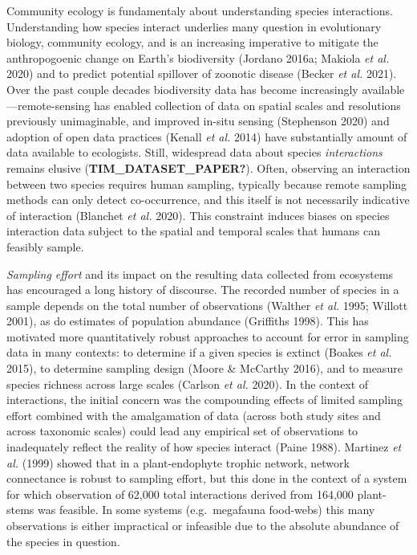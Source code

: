 \documentclass[10pt,oneside]{article}
\begin{document}
Community ecology is fundamentaly about understanding species
interactions. Understanding how species interact underlies many question
in evolutionary biology, community ecology, and is an increasing
imperative to mitigate the anthropogoenic change on Earth's biodiversity
(Jordano 2016a; Makiola \emph{et al.} 2020) and to predict potential
spillover of zoonotic disease (Becker \emph{et al.} 2021). Over the past
couple decades biodiversity data has become increasingly
available---remote-sensing has enabled collection of data on spatial
scales and resolutions previously unimaginable, and improved in-situ
sensing (Stephenson 2020) and adoption of open data practices (Kenall
\emph{et al.} 2014) have substantially amount of data available to
ecologists. Still, widespread data about species \emph{interactions}
remains elusive (\textbf{TIM\_DATASET\_PAPER?}). Often, observing an
interaction between two species requires human sampling, typically
because remote sampling methods can only detect co-occurrence, and this
itself is not necessarily indicative of interaction (Blanchet \emph{et
al.} 2020). This constraint induces biases on species interaction data
subject to the spatial and temporal scales that humans can feasibly
sample.

\emph{Sampling effort} and its impact on the resulting data collected
from ecosystems has encouraged a long history of discourse. The recorded
number of species in a sample depends on the total number of
observations (Walther \emph{et al.} 1995; Willott 2001), as do estimates
of population abundance (Griffiths 1998). This has motivated more
quantitatively robust approaches to account for error in sampling data
in many contexts: to determine if a given species is extinct (Boakes
\emph{et al.} 2015), to determine sampling design (Moore \& McCarthy
2016), and to measure species richness across large scales (Carlson
\emph{et al.} 2020). In the context of interactions, the initial concern
was the compounding effects of limited sampling effort combined with the
amalgamation of data (across both study sites and across taxonomic
scales) could lead any empirical set of observations to inadequately
reflect the reality of how species interact (Paine 1988). Martinez
\emph{et al.} (1999) showed that in a plant-endophyte trophic network,
network connectance is robust to sampling effort, but this done in the
context of a system for which observation of 62,000 total interactions
derived from 164,000 plant-stems was feasible. In some systems
(e.g.~megafauna food-webs) this many observations is either impractical
or infeasible due to the absolute abundance of the species in question.
\end{document}
